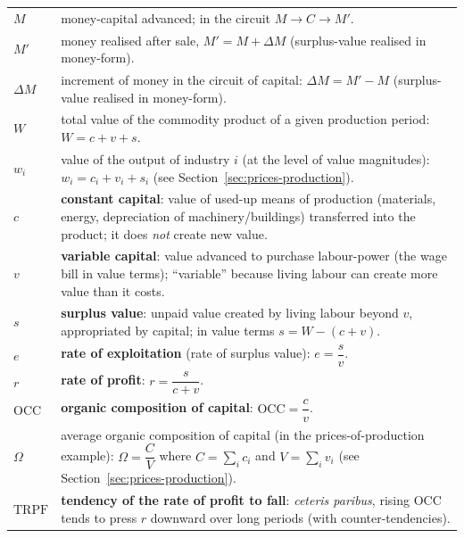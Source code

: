 \begin{longtable}{@{}>{\centering\arraybackslash}p{}@{\hspace{8pt}}%
                  >{\raggedright\arraybackslash}p{}@{}}
$M$ &
money-capital advanced; in the circuit $M \rightarrow C \rightarrow M'$. \\

$M'$ &
money realised after sale, $M' = M + \Delta M$ (surplus-value realised in money-form). \\

$\Delta M$ &
increment of money in the circuit of capital: $\Delta M = M' - M$ (surplus-value realised in money-form). \\

$W$ &
total value of the commodity product of a given production period: $W = c + v + s$. \\

$w_i$ &
value of the output of industry $i$ (at the level of value magnitudes): $w_i = c_i + v_i + s_i$ (see Section~\ref{sec:prices-production}). \\

$c$ &
\textbf{constant capital}: value of used-up means of production (materials, energy, depreciation of machinery/buildings) transferred into the product; it does \emph{not} create new value. \\

$v$ &
\textbf{variable capital}: value advanced to purchase labour-power (the wage bill in value terms); ``variable'' because living labour can create more value than it costs. \\

$s$ &
\textbf{surplus value}: unpaid value created by living labour beyond $v$, appropriated by capital; in value terms $s = W - (c+v)$. \\

$e$ &
\textbf{rate of exploitation} (rate of surplus value): $e = \dfrac{s}{v}$. \\

$r$ &
\textbf{rate of profit}: $r = \dfrac{s}{c+v}$. \\

$\mathrm{OCC}$ &
\textbf{organic composition of capital}: $\mathrm{OCC} = \dfrac{c}{v}$. \\

$\Omega$ &
average organic composition of capital (in the prices-of-production example): $\Omega = \dfrac{C}{V}$ where $C=\sum_i c_i$ and $V=\sum_i v_i$ (see Section~\ref{sec:prices-production}). \\

$\mathrm{TRPF}$ &
\textbf{tendency of the rate of profit to fall}: \emph{ceteris paribus}, rising $\mathrm{OCC}$ tends to press $r$ downward over long periods (with counter-tendencies). \\


\end{longtable}

